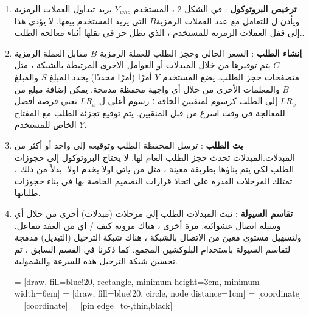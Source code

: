 \documentclass[12pt, a4paper, leqno]{report}
\makeatletter
\newenvironment{figurehere}
 {\def\@captype{figure}}
 {}
\theoremstyle{plain}
\theoremstyle{definition}
\makeatother
\begin{document}
\begin{multicols}{2}
\begin{otherlanguage}{arabic}
\begin{enumerate}
  \item \textbf{ترخيص البروتوكول} : في الشكل 2 ، المستخدم $Y_{who}$  يريد تبداول العملات الرمزية ويأذن ل   للتعامل مع عدد العملات الرمزية$B$  التي يريد المستخدم بيعها. لا يؤدي هذا إلى قفل العملات الرمزية للمستخدم ، الذي يظل حر في نقلها أثناء معالجة الطلب..
  
  \item \textbf{إنشاء الطلب} : السعر الحالي وحجز الطلب للعملة الرمزية $B$ مقابل العملة الرمزية $C$ يتم توفيرها من خلال المبدلات أو العوامل الأخرى المرتبطة بالشبكة ، مثل متصفحات حجز الطلب. يضع المستخدم $Y$ أمرًا (أمرًا محددًا) يحدد المبلغ $S$ والمبلغ $B$ والمعلمات الأخرى من خلال أي واجهة محفظة مدمجة. يمكن إضافة مبلغ من $LR_x$ إلى الطلب كرسوم لمنقبين الحاقة ؛ رسوم أعلى ل $LR_x$ تعني فرصة أفضل للمعالجة في وقت اسرع من قبل المنقبين. يتم توقيع تجزئة الطلب مع المفتاح الخاص للمستخدم $Y$.
  
  \item \textbf{بث الطلب} : ترسل المحفظة الطلب وتوقيعه إلى واحد أو أكثر من المبدلات.المبدلات تحدث حجز الطلب العام لها. لا يحتاج البروتوكول إلى حجوزات الطلب لكي يتم بناؤها بطريقة معينة ، مثل من ياتي اولا يخدم اولا. بدلاً من ذلك ، تمتلك المرحلات القدرة على اتخاذ قرارات التصميم الخاصة بها في بناء حجوزات طلباتها.
  
  \item \textbf{تقاسم السيولة} : تبث المبدلات الطلب إلى مرحلات (مبدلات) أخرى من خلال أي وسيلة اتصال عشوائية. مرة أخرى ، هناك مرونة كيف / اي من العقد تتفاعل. ولتسهيل مستوى معين من الاتصال بالشبكة ، هناك شبكة الترحيل (التبديل) مدمجة لتقاسم السيولة باستخدام البلوكشين المجمع. كما ذكرنا في القسم السابق ، تم تحسين شبكة الترحيل هذه للسرعة والشمولية.
\begin{center}
\begin{figurehere}
\centering
{} = [draw, fill=blue!20, rectangle, 
    minimum height=3em, minimum width=6em]
 = [draw, fill=blue!20, circle, node distance=1cm]
 = [coordinate]
 = [coordinate]
 = [pin edge={to-,thin,black}]

\begin{tikzpicture}[
    auto, 
    scale=0.7,
    node distance=2cm,
    >=latex',
    font=\bfseries\footnotesize\sffamily,
    order/.style={
		rectangle,
		scale=0.7,
		rounded corners,
		draw=black, 
		text centered,
		minimum height=12mm,
		minimum width=30mm,
		fill=white
	},
	role/.style={
		circle,
		scale=0.7,
		draw=black, 
		text centered,
		minimum height=12mm,
		minimum width=12mm,
		fill=white
	},
	steps/.style={
		circle,
		scale=0.7,
		draw=black, 
		text centered,
		fill=black,
		text=white
	},
	account/.style={
		circle,
		scale=0.7,
		draw=black, 
		text centered,
		minimum height=16mm,
		minimum width=16mm,
		fill=white
	},
	label/.style={
	  scale=0.7
    }
  ]


\end{tikzpicture}
\end{figurehere}
\end{center}
\end{enumerate}
\end{otherlanguage}
\end{multicols}
\end{document}
